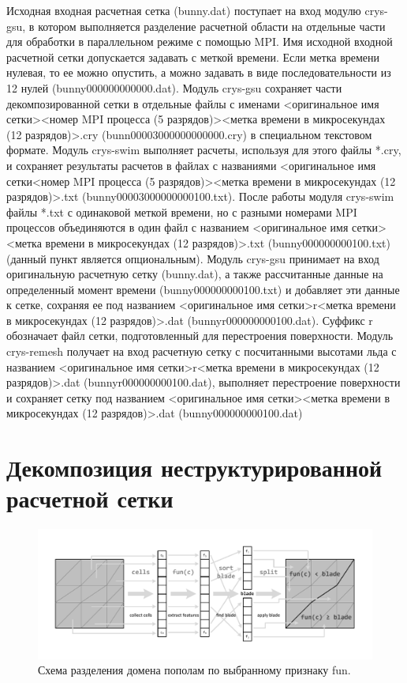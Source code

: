 \documentclass[
11pt,%
tightenlines,%
twoside,%
onecolumn,%
nofloats,%
nobibnotes,%
nofootinbib,%
superscriptaddress,%
noshowpacs,%
centertags]%
{revtex4}
\begin{document}
Исходная входная расчетная сетка (bunny.dat) поступает на вход модулю crys-gsu, в котором выполняется разделение расчетной области на отдельные части для обработки в параллельном режиме с помощью MPI. Имя исходной входной расчетной сетки допускается задавать с меткой времени. Если метка времени нулевая, то ее можно опустить, а можно задавать в виде последовательности из 12 нулей (bunny000000000000.dat).
Модуль crys-gsu сохраняет части декомпозированной сетки в отдельные файлы с именами <оригинальное имя сетки><номер MPI процесса (5 разрядов)><метка времени в микросекундах (12 разрядов)>.cry (bunn00003000000000000.cry) в специальном текстовом формате.
Модуль crys-swim выполняет расчеты, используя для этого файлы *.cry, и сохраняет результаты расчетов в файлах с названиями <оригинальное имя сетки<номер MPI процесса (5 разрядов)><метка времени в микросекундах (12 разрядов)>.txt (bunny00003000000000100.txt).
После работы модуля crys-swim файлы *.txt с одинаковой меткой времени, но с разными номерами MPI процессов объединяются в один файл с названием <оригинальное имя сетки><метка времени в микросекундах (12 разрядов)>.txt (bunny000000000100.txt) (данный пункт является опциональным).
Модуль crys-gsu принимает на вход оригинальную расчетную сетку (bunny.dat), а также рассчитанные данные на определенный момент времени (bunny000000000100.txt) и добавляет эти данные к сетке, сохраняя ее под названием <оригинальное имя сетки>r<метка времени в микросекундах (12 разрядов)>.dat (bunnyr000000000100.dat). Суффикс r обозначает файл сетки, подготовленный для перестроения поверхности.
Модуль crys-remesh получает на вход расчетную сетку с посчитанными высотами льда с названием <оригинальное имя сетки>r<метка времени в микросекундах (12 разрядов)>.dat (bunnyr000000000100.dat), выполняет перестроение поверхности и сохраняет сетку под названием <оригинальное имя сетки><метка времени в микросекундах (12 разрядов)>.dat (bunny000000000100.dat)

\section{Декомпозиция неструктурированной расчетной сетки}

\begin{figure}[h]
\includegraphics[width=1.0\textwidth]{pics/03-split.pdf}
\caption{Схема разделения домена пополам по выбранному признаку fun.}\label{fig:03-split}
\end{figure}
\end{document}
